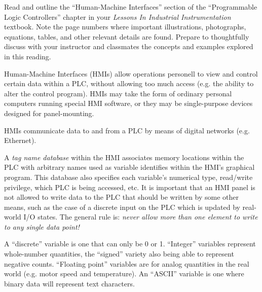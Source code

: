 

Read and outline the ``Human-Machine Interfaces'' section of the ``Programmable Logic Controllers'' chapter in your {\it Lessons In Industrial Instrumentation} textbook.  Note the page numbers where important illustrations, photographs, equations, tables, and other relevant details are found.  Prepare to thoughtfully discuss with your instructor and classmates the concepts and examples explored in this reading.














Human-Machine Interfaces (HMIs) allow operations personell to view and control certain data within a PLC, without allowing too much access (e.g. the ability to alter the control program).  HMIs may take the form of ordinary personal computers running special HMI software, or they may be single-purpose devices designed for panel-mounting.

\vskip 10pt

HMIs communicate data to and from a PLC by means of digital networks (e.g. Ethernet).

\vskip 10pt

A {\it tag name database} within the HMI associates memory locations within the PLC with arbitrary names used as variable identifies within the HMI's graphical program.  This database also specifies each variable's numerical type, read/write privilege, which PLC is being accessed, etc.  It is important that an HMI panel is not allowed to write data to the PLC that should be written by some other means, such as the case of a discrete input on the PLC which is updated by real-world I/O states.  The general rule is: {\it never allow more than one element to write to any single data point!}

A ``discrete'' variable is one that can only be 0 or 1.  ``Integer'' variables represent whole-number quantities, the ``signed'' variety also being able to represent negative counts.  ``Floating point'' variables are for analog quantities in the real world (e.g. motor speed and temperature).  An ``ASCII'' variable is one where binary data will represent text characters.

